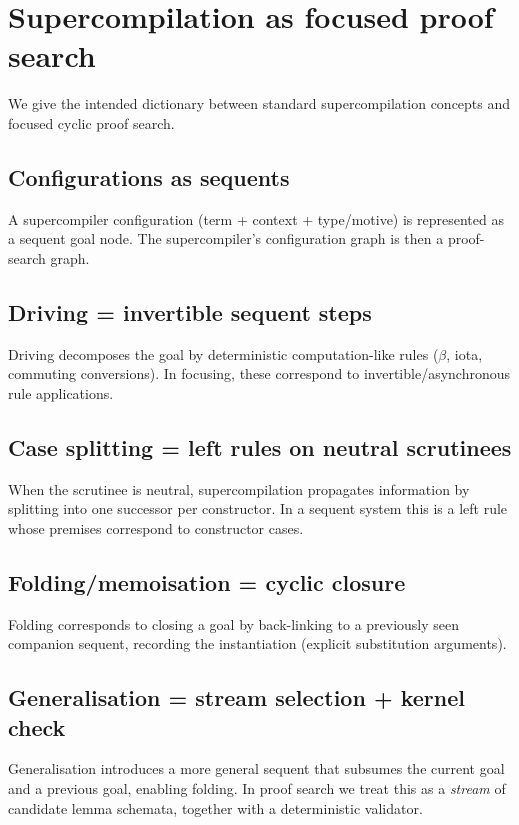 \section{Supercompilation as focused proof search}
\label{sec:sc-as-search}

We give the intended dictionary between standard supercompilation concepts and focused cyclic proof search.

\subsection{Configurations as sequents}
A supercompiler configuration (term + context + type/motive) is represented as a sequent goal node.
The supercompiler's configuration graph is then a proof-search graph.

\subsection{Driving = invertible sequent steps}
Driving decomposes the goal by deterministic computation-like rules (\(\beta\), iota, commuting conversions). In focusing, these correspond to invertible/asynchronous rule applications.

\subsection{Case splitting = left rules on neutral scrutinees}
When the scrutinee is neutral, supercompilation propagates information by splitting into one successor per constructor. In a sequent system this is a left rule whose premises correspond to constructor cases.

\subsection{Folding/memoisation = cyclic closure}
Folding corresponds to closing a goal by back-linking to a previously seen companion sequent, recording the instantiation (explicit substitution arguments).

\subsection{Generalisation = stream selection + kernel check}
Generalisation introduces a more general sequent that subsumes the current goal and a previous goal, enabling folding.
In proof search we treat this as a \emph{stream} of candidate lemma schemata, together with a deterministic validator.

